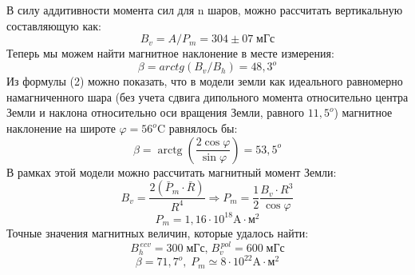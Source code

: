 \documentclass[a4paper, 12pt]{article}
\begin{document}
В силу аддитивности момента сил для n шаров, можно рассчитать вертикальную составляющую как:
\begin{displaymath}B_{v}=A / P_{m} = 304 \pm 07 \; \text{мГс}\end{displaymath}
Теперь мы можем найти магнитное наклонение в месте измерения:
\begin{displaymath} \beta = arctg(B_{v} / B_{h}) = 48,3^{o}\end{displaymath}
Из формулы (2) можно показать, что в модели земли как идеального равномерно намагниченного шара (без учета сдвига дипольного момента относительно центра Земли и наклона относительно оси вращения Земли, равного $11,5^{o}$)  магнитное наклонение на широте $\varphi = 56^{o}$C равнялось бы:
\begin{displaymath} \beta=\operatorname{arctg}\left(\frac{2 \cos \varphi}{\sin \varphi}\right) = 53,5^{o} \end{displaymath}
В рамках этой модели можно рассчитать магнитный момент Земли:
    \begin{equation}
    B_{v}=\frac{2\left(\bar{P}_{m} \cdot \bar{R}\right)}{R^{4}} \Rightarrow P_{m}=\frac{1}{2} \frac{B_{v} \cdot R^{3}}{\cos \varphi} \end{equation}
    \begin{displaymath} P_{m}= 1,16 \cdot 10^{18} \text{A} \cdot \text{м}^{2}\end{displaymath}
    Точные значения магнитных величин, которые удалось найти:
    \begin{displaymath} B_{h}^{\, ecv}= 300\; \text{мГс,} \;  B_{v}^{\, pol}= 600 \; \text{мГс}\end{displaymath}
    \begin{displaymath} \beta = 71,7^{o}, \; P_{m} \simeq 8 \cdot 10^{22} \text{A} \cdot \text{м}^{2}  \end{displaymath}
    


\end{document}
